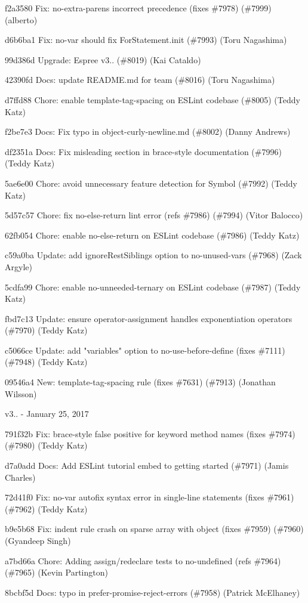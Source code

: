 \begin{DoxyItemize}
\item f2a3580 Fix\+: {\ttfamily no-\/extra-\/parens} incorrect precedence (fixes \#7978) (\#7999) (alberto)
\item d6b6ba1 Fix\+: no-\/var should fix For\+Statement.\+init (\#7993) (Toru Nagashima)
\item 99d386d Upgrade\+: Espree v3.. (\#8019) (Kai Cataldo)
\item 42390fd Docs\+: update README.\+md for team (\#8016) (Toru Nagashima)
\item d7ffd88 Chore\+: enable template-\/tag-\/spacing on ESLint codebase (\#8005) (Teddy Katz)
\item f2be7e3 Docs\+: Fix typo in object-\/curly-\/newline.\+md (\#8002) (Danny Andrews)
\item df2351a Docs\+: Fix misleading section in brace-\/style documentation (\#7996) (Teddy Katz)
\item 5ae6e00 Chore\+: avoid unnecessary feature detection for Symbol (\#7992) (Teddy Katz)
\item 5d57c57 Chore\+: fix no-\/else-\/return lint error (refs \#7986) (\#7994) (Vitor Balocco)
\item 62fb054 Chore\+: enable no-\/else-\/return on ESLint codebase (\#7986) (Teddy Katz)
\item c59a0ba Update\+: add ignore\+Rest\+Siblings option to no-\/unused-\/vars (\#7968) (Zack Argyle)
\item 5cdfa99 Chore\+: enable no-\/unneeded-\/ternary on ESLint codebase (\#7987) (Teddy Katz)
\item fbd7c13 Update\+: ensure operator-\/assignment handles exponentiation operators (\#7970) (Teddy Katz)
\item c5066ce Update\+: add "{}variables"{} option to no-\/use-\/before-\/define (fixes \#7111) (\#7948) (Teddy Katz)
\item 09546a4 New\+: {\ttfamily template-\/tag-\/spacing} rule (fixes \#7631) (\#7913) (Jonathan Wilsson)
\end{DoxyItemize}

v3.. -\/ January 25, 2017


\begin{DoxyItemize}
\item 791f32b Fix\+: brace-\/style false positive for keyword method names (fixes \#7974) (\#7980) (Teddy Katz)
\item d7a0add Docs\+: Add ESLint tutorial embed to getting started (\#7971) (Jamis Charles)
\item 72d41f0 Fix\+: no-\/var autofix syntax error in single-\/line statements (fixes \#7961) (\#7962) (Teddy Katz)
\item b9e5b68 Fix\+: indent rule crash on sparse array with object (fixes \#7959) (\#7960) (Gyandeep Singh)
\item a7bd66a Chore\+: Adding assign/redeclare tests to no-\/undefined (refs \#7964) (\#7965) (Kevin Partington)
\item 8bcbf5d Docs\+: typo in prefer-\/promise-\/reject-\/errors (\#7958) (Patrick Mc\+Elhaney)
\end{DoxyItemize}

